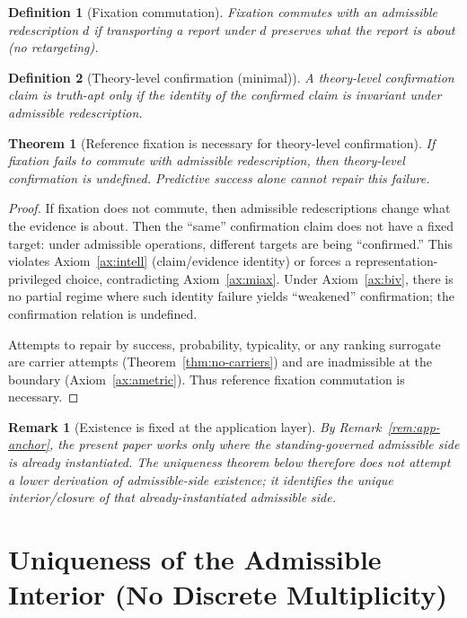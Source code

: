 \documentclass[12pt]{article}
\newtheorem{definition}{Definition}
\newtheorem{theorem}{Theorem}
\newtheorem{remark}{Remark}
\begin{document}
\begin{definition}[Fixation commutation]
Fixation \emph{commutes} with an admissible redescription $d$ if transporting a report under $d$ preserves what the report is about (no retargeting).
\end{definition}

\begin{definition}[Theory-level confirmation (minimal)]
A \emph{theory-level confirmation} claim is truth-apt only if the identity of the confirmed claim is invariant under admissible redescription.
\end{definition}

\begin{theorem}[Reference fixation is necessary for theory-level confirmation]
\label{thm:ref-fix}
If fixation fails to commute with admissible redescription, then theory-level confirmation is undefined. Predictive success alone cannot repair this failure.
\end{theorem}

\begin{proof}
If fixation does not commute, then admissible redescriptions change what the evidence is about. Then the ``same'' confirmation claim does not have a fixed target:
under admissible operations, different targets are being ``confirmed.'' This violates Axiom~\ref{ax:intell} (claim/evidence identity) or forces a representation-privileged choice,
contradicting Axiom~\ref{ax:miax}. Under Axiom~\ref{ax:biv}, there is no partial regime where such identity failure yields ``weakened'' confirmation; the confirmation relation is undefined.

Attempts to repair by success, probability, typicality, or any ranking surrogate are carrier attempts (Theorem~\ref{thm:no-carriers}) and are inadmissible at the boundary (Axiom~\ref{ax:ametric}).
Thus reference fixation commutation is necessary.
\end{proof}

\begin{remark}[Existence is fixed at the application layer]
\label{rem:interior-existence}
By Remark~\ref{rem:app-anchor}, the present paper works only where the standing-governed admissible side is already instantiated.
The uniqueness theorem below therefore does not attempt a lower derivation of admissible-side existence; it identifies the unique interior/closure of that already-instantiated admissible side.
\end{remark}

\section{Uniqueness of the Admissible Interior (No Discrete Multiplicity)}
\label{sec:unique}
\end{document}
